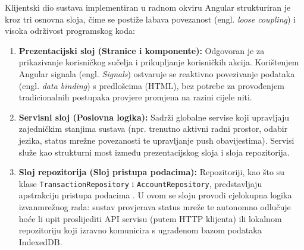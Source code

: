 \documentclass[a4paper,12pt,oneside]{article}
\begin{document}
	Klijentski dio sustava implementiran u radnom okviru Angular strukturiran je kroz tri osnovna sloja, čime se postiže labava povezanost (engl. \textit{loose coupling}) i visoka održivost programskog koda:
	\begin{enumerate}
		\item \textbf{Prezentacijski sloj (Stranice i komponente):} Odgovoran je za prikazivanje korisničkog sučelja i prikupljanje korisničkih akcija. Korištenjem Angular signala (engl. \textit{Signals}) ostvaruje se reaktivno povezivanje podataka (engl. \textit{data binding}) s predlošcima (HTML), bez potrebe za provođenjem tradicionalnih postupaka provjere promjena na razini cijele niti.
		
		\item \textbf{Servisni sloj (Poslovna logika):} Sadrži globalne servise koji upravljaju zajedničkim stanjima sustava (npr. trenutno aktivni radni prostor, odabir jezika, status mrežne povezanosti te upravljanje push obavijestima). Servisi služe kao strukturni most između prezentacijskog sloja i sloja repozitorija.
		
		\item \textbf{Sloj repozitorija (Sloj pristupa podacima):} Repozitoriji, kao što su klase \texttt{Transaction\-Repository} i \texttt{Account\-Repository}, predstavljaju apstrakciju pristupa podacima \cite{b_martin}. U ovom se sloju provodi cjelokupna logika izvanmrežnog rada: sustav provjerava status mreže te autonomno odlučuje hoće li upit proslijediti API servisu (putem HTTP klijenta) ili lokalnom repozitoriju koji izravno komunicira s ugrađenom bazom podataka IndexedDB.
	\end{enumerate}
\end{document}

